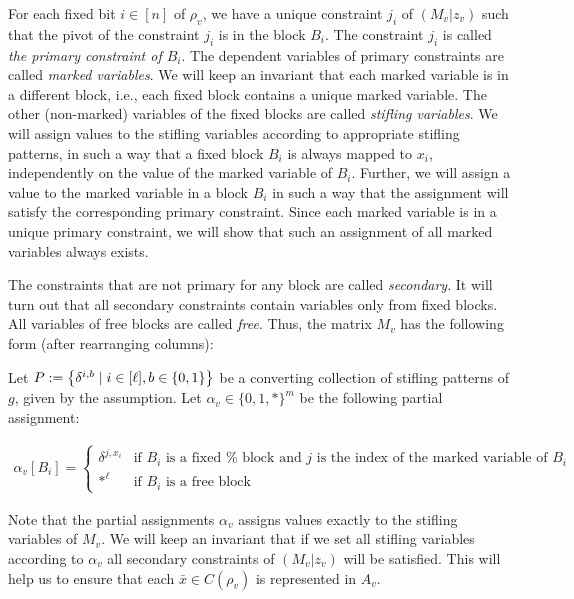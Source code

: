 \documentclass[10pt,a4paper]{article}
\begin{document}
For each fixed bit $i\in[n]$ of $\rho_{v}$, we have a unique constraint $j_{i}$ of $(M_{v}|z_{v})$ such that the pivot of the constraint $j_{i}$ is in the block $B_{i}$.
The constraint $j_{i}$ is called \emph{the primary constraint of $B_{i}$}.
The dependent variables of primary constraints are called \emph{marked variables}.
We will keep an invariant that each marked variable is in a different block, i.e., each fixed block contains a unique marked variable.
The other (non-marked) variables of the fixed blocks are called \emph{stifling variables}.
We will assign values to the stifling variables according to appropriate stifling patterns, in such a way that a fixed block $B_{i}$ is always mapped to $x_{i}$, independently on the value of the marked variable of $B_{i}$.
Further, we will assign a value to the marked variable in a block $B_{i}$ in such a way that the assignment will satisfy the corresponding primary constraint.
Since each marked variable is in a unique primary constraint, we will show that such an assignment of all marked variables always exists.\par




The constraints that are not primary for any block are called \emph{secondary}.
It will turn out that all secondary constraints contain variables only from fixed blocks.
All variables of free blocks are called \emph{free}.
Thus, the matrix $M_{v}$ has the following form (after rearranging columns):\par







Let $P:=\bigl{\{}\delta^{i,b}\mid i\in[\ell],b\in\{0,1\}\bigr{\}}$ be a converting collection of stifling patterns of $g$, given by the assumption.
Let $\alpha_{v}\in\{0,1,*\}^{m}$ be the following partial assignment:\par


\[\begin{gathered}
\alpha_{v}[B_{i}]=\begin{cases}\delta^{j,x_{i}}&\text{if $B_{i}$ is a fixed %
block and $j$ is the index of the marked variable of $B_{i}$}\\
*^{\ell}&\text{if $B_{i}$ is a free block}\end{cases}
\end{gathered}\]


Note that the partial assignments $\alpha_{v}$ assigns values exactly to the stifling variables of $M_{v}$.
We will keep an invariant that if we set all stifling variables according to $\alpha_{v}$ all secondary constraints of $(M_{v}|z_{v})$ will be satisfied.
This will help us to ensure that each $\bar{x}\in C(\rho_{v})$ is represented in $A_{v}$.\par
\end{document}
